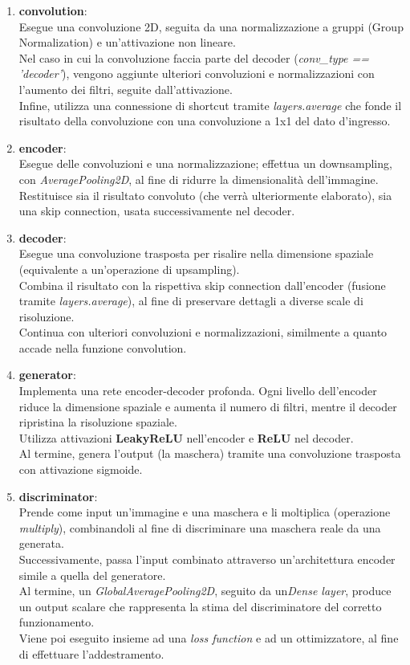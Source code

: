 \documentclass[12pt,a4paper,openright,twoside]{book}
\begin{document}
\begin{enumerate}
\item \textbf{convolution}:\\
Esegue una convoluzione 2D, seguita da una normalizzazione a gruppi (Group Normalization) e un'attivazione non lineare.\\
Nel caso in cui la convoluzione faccia parte del decoder ({\itshape conv\_type == 'decoder'}), vengono aggiunte ulteriori convoluzioni e normalizzazioni con l'aumento dei filtri, seguite dall'attivazione.\\
Infine, utilizza una connessione di shortcut tramite {\itshape layers.average} che fonde il risultato della convoluzione con una convoluzione a 1x1 del dato d'ingresso.

\item \textbf{encoder}:\\
Esegue delle convoluzioni e una normalizzazione; effettua un downsampling, con {\itshape AveragePooling2D}, al fine di ridurre la dimensionalità dell'immagine.\\
Restituisce sia il risultato convoluto (che verrà ulteriormente elaborato), sia una skip connection, usata successivamente nel decoder.

\item \textbf{decoder}:\\
Esegue una convoluzione trasposta per risalire nella dimensione spaziale (equivalente a un'operazione di upsampling).\\
Combina il risultato con la rispettiva skip connection dall'encoder (fusione tramite {\itshape layers.average}), al fine di preservare dettagli a diverse scale di risoluzione.\\
Continua con ulteriori convoluzioni e normalizzazioni, similmente a quanto accade nella funzione convolution.

\item \textbf{generator}:\\
Implementa una rete encoder-decoder profonda. Ogni livello dell'encoder riduce la dimensione spaziale e aumenta il numero di filtri, mentre il decoder ripristina la risoluzione spaziale.\\
Utilizza attivazioni \textbf{LeakyReLU} nell'encoder e \textbf{ReLU} nel decoder.\\
Al termine, genera l'output (la maschera) tramite una convoluzione trasposta con attivazione sigmoide.

\item \textbf{discriminator}:\\
Prende come input un'immagine e una maschera e li moltiplica (operazione {\itshape multiply}), combinandoli al fine di discriminare una maschera reale da una generata.\\
Successivamente, passa l'input combinato attraverso un'architettura encoder simile a quella del generatore.\\
Al termine, un {\itshape GlobalAveragePooling2D}, seguito da un{\itshape Dense layer}, produce un output scalare che rappresenta la stima del discriminatore del corretto funzionamento.\\
Viene poi eseguito insieme ad una {\itshape loss function} e ad un ottimizzatore, al fine di effettuare l'addestramento.


\end{enumerate}
\end{document}
